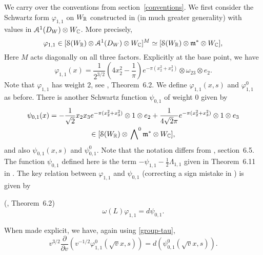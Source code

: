 We carry over the conventions from section~\ref{conventions}. We first consider the Schwartz form $\varphi_{1,1}$ on $W_{\mathbb{R}}$ constructed in \cite{FMcoeff} (in much greater generality) with values in $\mathcal{A}^1(D_W) \otimes W_{\mathbb{C}}$. More precisely,
\[
\varphi_{1,1} \in [\mathcal{S}(W_{\mathbb{R}}) \otimes \mathcal{A}^1(D_W) \otimes W_{\mathbb{C}}]^M \simeq
[\mathcal{S}(W_{\mathbb{R}}) \otimes \mathfrak{m}^{\ast} \otimes W_{\mathbb{C}}],
\]
Here $M$ acts diagonally on all three factors. Explicitly at the base point, we have
\begin{equation*}
\varphi_{1,1}(x) = \frac{1}{2^{3/2}} \left(4 x_2^2-\frac1{\pi}\right) e^{-\pi (x_2^2+x_3^2)} \otimes \omega_{23} \otimes e_2.
\end{equation*}
Note that $\varphi_{1,1}$ has weight $2$, see \cite{FMcoeff}, Theorem~6.2. We define $\varphi_{1,1}(x,s)$ and $\varphi_{1,1}^0$ as before. There is another Schwartz function $\psi_{0,1}$ of weight $0$ given by
\begin{multline*}
\psi_{0,1}(x) =   -\frac1{\sqrt{2}} x_2x_3 e^{-\pi(x_2^2+x_3^2)}  \otimes 1 \otimes e_2 + \frac{1}{4\sqrt{2}\pi} e^{-\pi(x_2^2+x_3^2)} \otimes 1\otimes e_3 \\ \in
[\mathcal{S}(W_{\mathbb{R}}) \otimes \sideset{}{^{0}}\bigwedge \mathfrak{m}^{\ast} \otimes W_{\mathbb{C}}],
\end{multline*}
and also $\psi_{0,1}(x,s)$ and $\psi_{0,1}^0$. Note that the notation differs from \cite{FMcoeff}, section~6.5. The function $\psi_{0,1}$ defined here is the term $-\psi_{1,1} - \tfrac12 \Lambda_{1,1}$ given in Theorem~6.11 in \cite{FMcoeff}. 
The key relation between $\varphi_{1,1}$ and $\psi_{0,1}$ (correcting a sign mistake in \cite{FMcoeff}) is given by

\begin{theorem}(\cite{FMcoeff}, Theorem~6.2\label{Millson})\label{localholW}
\[
\omega(L) \varphi_{1,1} = d \psi_{0,1}.
\]
\end{theorem}

When made explicit, we have, again using \eqref{group-tau},
\begin{equation}
v^{3/2} \frac{\partial}{\partial v } \left(v^{-1/2} \varphi_{1,1}^0(\sqrt{v}x,s) \right)=  d
\left(\psi_{0,1}^0(\sqrt{v}x,s)\right).
\end{equation}



